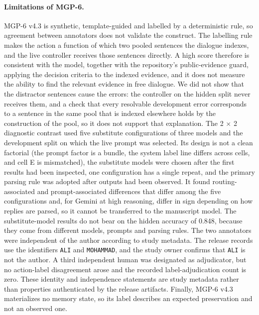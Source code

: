 \paragraph{Limitations of MGP-6.} MGP-6 v4.3 is synthetic, template-guided and labelled by a deterministic rule, so agreement between annotators does not validate the construct. The labelling rule makes the action a function of which two pooled sentences the dialogue indexes, and the live controller receives those sentences directly. A high score therefore is consistent with the model, together with the repository's public-evidence guard, applying the decision criteria to the indexed evidence, and it does not measure the ability to find the relevant evidence in free dialogue. We did not show that the distractor sentences cause the errors: the controller on the hidden split never receives them, and a check that every resolvable development error corresponds to a sentence in the same pool that is indexed elsewhere holds by the construction of the pool, so it does not support that explanation. The 2 $\times$ 2 diagnostic contrast used five substitute configurations of three models and the development split on which the live prompt was selected. Its design is not a clean factorial (the prompt factor is a bundle, the system label line differs across cells, and cell E is mismatched), the substitute models were chosen after the first results had been inspected, one configuration has a single repeat, and the primary parsing rule was adopted after outputs had been observed. It found routing-associated and prompt-associated differences that differ among the five configurations and, for Gemini at high reasoning, differ in sign depending on how replies are parsed, so it cannot be transferred to the manuscript model. The substitute-model results do not bear on the hidden accuracy of 0.848, because they come from different models, prompts and parsing rules. The two annotators were independent of the author according to study metadata. The release records use the identifiers \texttt{ALI} and \texttt{MOHAMMAD}, and the study owner confirms that \texttt{ALI} is not the author. A third independent human was designated as adjudicator, but no action-label disagreement arose and the recorded label-adjudication count is zero. These identity and independence statements are study metadata rather than properties authenticated by the release artifacts. Finally, MGP-6 v4.3 materializes no memory state, so its \keep{} label describes an expected preservation and not an observed one.

